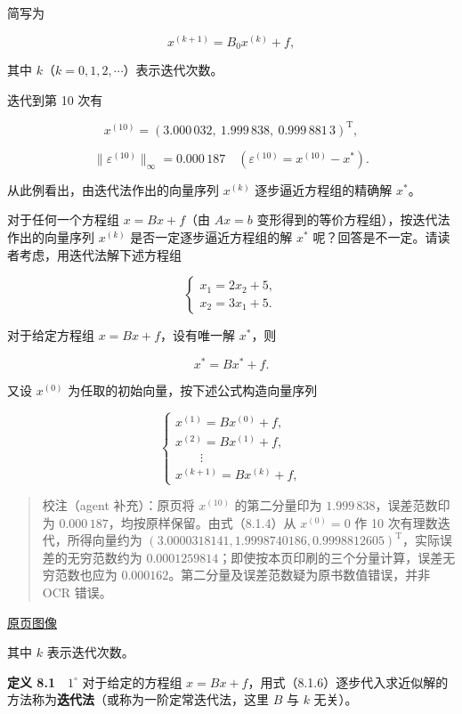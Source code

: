 \documentclass[
  10pt,
  fontset=fandol]{ctexart}
\begin{document}
简写为

\[
x^{(k+1)}=B_0x^{(k)}+f,
\]

其中 \(k\)（\(k=0,1,2,\cdots\)）表示迭代次数。

迭代到第 10 次有

\[
x^{(10)}=(3.000\,032,\ 1.999\,838,\ 0.999\,881\,3)^{\mathrm T},
\]

\[
\|\varepsilon^{(10)}\|_\infty=0.000\,187\quad(\varepsilon^{(10)}=x^{(10)}-x^*).
\]

从此例看出，由迭代法作出的向量序列 \(x^{(k)}\) 逐步逼近方程组的精确解 \(x^*\)。

对于任何一个方程组 \(x=Bx+f\)（由 \(Ax=b\) 变形得到的等价方程组），按迭代法作出的向量序列 \(x^{(k)}\) 是否一定逐步逼近方程组的解 \(x^*\) 呢？回答是不一定。请读者考虑，用迭代法解下述方程组

\[
\begin{cases}
x_1=2x_2+5,\\
x_2=3x_1+5.
\end{cases}
\]

对于给定方程组 \(x=Bx+f\)，设有唯一解 \(x^*\)，则

\[
x^*=Bx^*+f.
\tag{8.1.5}
\]

又设 \(x^{(0)}\) 为任取的初始向量，按下述公式构造向量序列

\[
\begin{cases}
x^{(1)}=Bx^{(0)}+f,\\
x^{(2)}=Bx^{(1)}+f,\\
\qquad\vdots\\
x^{(k+1)}=Bx^{(k)}+f,
\end{cases}
\tag{8.1.6}
\]

\begin{quote}
校注（agent 补充）：原页将 \(x^{(10)}\) 的第二分量印为 \(1.999\,838\)，误差范数印为 \(0.000\,187\)，均按原样保留。由式（8.1.4）从 \(x^{(0)}=0\) 作 10 次有理数迭代，所得向量约为 \((3.0000318141,1.9998740186,0.9998812605)^{\mathrm T}\)，实际误差的无穷范数约为 \(0.0001259814\)；即使按本页印刷的三个分量计算，误差无穷范数也应为 \(0.000162\)。第二分量及误差范数疑为原书数值错误，并非 OCR 错误。
\end{quote}

\href{../../source-images/pdf-217.jpeg}{原页图像}

其中 \(k\) 表示迭代次数。

\textbf{定义 8.1}　\(1^\circ\) 对于给定的方程组 \(x=Bx+f\)，用式（8.1.6）逐步代入求近似解的方法称为\textbf{迭代法}（或称为一阶定常迭代法，这里 \(B\) 与 \(k\) 无关）。
\end{document}
